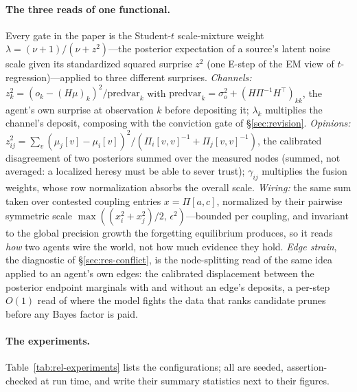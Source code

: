 \documentclass[runningheads]{llncs}
\begin{document}
\paragraph{The three reads of one functional.}
Every gate in the paper is the Student-$t$ scale-mixture weight
$\lambda=(\nu+1)/(\nu+z^2)$---the posterior expectation of a source's latent noise scale given
its standardized squared surprise $z^2$ (one E-step of the EM view of $t$-regression)---applied
to three different surprises. \emph{Channels:} $z_k^2=(o_k-(H\mu)_k)^2/\mathrm{predvar}_k$ with
$\mathrm{predvar}_k=\sigma_o^2+(H\Pi^{-1}H^{\!\top})_{kk}$, the agent's own surprise at
observation $k$ before depositing it; $\lambda_k$ multiplies the channel's deposit, composing
with the conviction gate of \S\ref{sec:revision}. \emph{Opinions:}
$z_{ij}^2=\sum_v(\mu_j[v]-\mu_i[v])^2/(\Pi_i[v,v]^{-1}+\Pi_j[v,v]^{-1})$, the calibrated
disagreement of two posteriors summed over the measured nodes (summed, not averaged: a localized
heresy must be able to sever trust); $\gamma_{ij}$ multiplies the fusion weights, whose row
normalization absorbs the overall scale. \emph{Wiring:} the same sum taken over contested
coupling entries $x=\Pi[a,c]$, normalized by their pairwise symmetric scale
$\max((x_i^2+x_j^2)/2,\,\epsilon^2)$---bounded per coupling, and invariant to the global
precision growth the forgetting equilibrium produces, so it reads \emph{how} two agents wire
the world, not how much evidence they hold. \emph{Edge strain}, the diagnostic of
\S\ref{sec:res-conflict}, is the node-splitting read of the same idea applied to an agent's own
edges: the calibrated displacement between the posterior endpoint marginals with and without an
edge's deposits, a per-step $O(1)$ read of where the model fights the data that ranks candidate
prunes before any Bayes factor is paid.

\paragraph{The experiments.}
Table~\ref{tab:rel-experiments} lists the configurations; all are seeded, assertion-checked at
run time, and write their summary statistics next to their figures.
\end{document}
